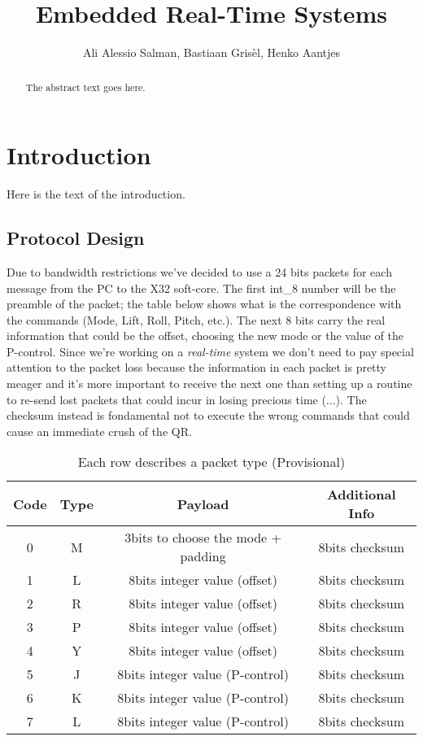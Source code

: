 \documentclass{article}
\begin{document}
\title{\textbf{Embedded Real-Time Systems}}
\author{Ali Alessio Salman, Bastiaan Grisèl, Henko Aantjes}

\maketitle

\begin{abstract}
\begin{center}
The abstract text goes here. 
\end{center}
\end{abstract}

\section{Introduction}
Here is the text of the introduction.

\subsection{Protocol Design}
\justifying
Due to bandwidth restrictions we've decided to use a 24 bits packets for each message from the PC to the X32 soft-core. The first int\_8 number will be the preamble of the packet; the table below shows what is the correspondence with the commands (Mode, Lift, Roll, Pitch, etc.). The next 8 bits carry the real information that could be the offset, choosing the new mode or the value of the P-control.  
Since we're working on a \textit{real-time} system we don't need to pay special attention to the packet loss because the information in each packet is pretty meager and it's more important to receive the next one than setting up a routine to re-send lost packets that could incur in losing precious time (...).  
The checksum instead is fondamental not to execute the wrong commands that could cause an immediate crush of the QR. 
\vspace{2em}


\begin{table}[h!]
\centering
 \begin{tabular}{||c|c|c|c||} 
 \hline
 Code & Type & Payload & Additional Info \\ [0.5ex] 
 \hline\hline
 0 & M & 3bits to choose the mode + padding & 8bits checksum \\ 
 \hline
 1 & L & 8bits integer value (offset) & 8bits checksum \\
 \hline
 2 & R & 8bits integer value (offset) & 8bits checksum \\
 \hline
 3 & P & 8bits integer value (offset) & 8bits checksum \\
 \hline
 4 & Y & 8bits integer value (offset) & 8bits checksum\\ 
 \hline
 5 & J & 8bits integer value (P-control) & 8bits checksum\\ 
 \hline
 6 & K & 8bits integer value (P-control) & 8bits checksum\\ 
 \hline
 7 & L & 8bits integer value (P-control) & 8bits checksum\\ 
 \hline
\end{tabular}
\caption{Each row describes a packet type (Provisional)}
\label{table:1}
\end{table}
\end{document}
